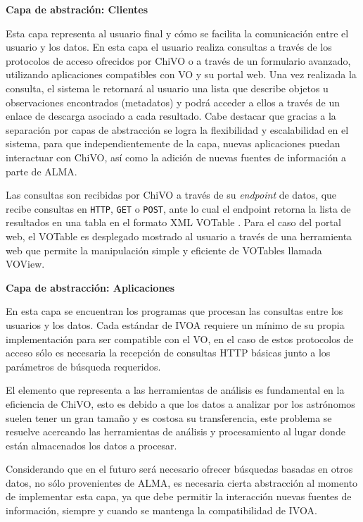 \textbf{Capa de abstración: Clientes}

Esta capa representa al usuario final y cómo se facilita la comunicación entre el
usuario y los datos.
En esta capa el usuario realiza consultas a través de los protocolos de acceso
ofrecidos por ChiVO o a través de un formulario avanzado, utilizando aplicaciones
compatibles con VO y su portal web.
Una vez realizada la consulta, el sistema le retornará al usuario una lista que
describe objetos u observaciones encontrados (metadatos) y podrá acceder a ellos a
través de un enlace de descarga asociado a cada resultado.
Cabe destacar que gracias a la separación por capas de abstracción se logra la
flexibilidad y escalabilidad en el sistema, para que independientemente de la capa,
nuevas aplicaciones puedan interactuar con ChiVO, así como la adición de nuevas
fuentes de información a parte de ALMA.

Las consultas son recibidas por ChiVO a través de su \emph{endpoint} de datos, que
recibe consultas en \texttt{HTTP}, \texttt{GET} o \texttt{POST}, ante lo cual el
endpoint retorna la lista de resultados en una tabla en el formato XML VOTable 
\cite{ochsenbein2011ivoa}.
Para el caso del portal web, el VOTable es desplegado mostrado al usuario a través
de una herramienta web que permite la manipulación simple y eficiente de VOTables
llamada VOView.

\textbf{Capa de abstracción: Aplicaciones}

En esta capa se encuentran los programas que procesan las consultas entre los
usuarios y los datos.
Cada estándar de IVOA requiere un mínimo de su propia implementación para ser
compatible con el VO, en el caso de estos protocolos de acceso sólo es necesaria la
recepción de consultas HTTP básicas junto a los parámetros de búsqueda requeridos.

El elemento que representa a las herramientas de análisis es fundamental en la
eficiencia de ChiVO, esto es debido a que los datos a analizar por los astrónomos
suelen tener un gran tamaño y es costosa su transferencia, este problema se
resuelve acercando las herramientas de análisis y procesamiento al lugar donde están
almacenados los datos a procesar.

Considerando que en el futuro será necesario ofrecer búsquedas
basadas en otros datos, no sólo provenientes de ALMA, es necesaria cierta
abstracción al momento de implementar esta capa, ya que debe permitir la interacción
nuevas fuentes de información, siempre y cuando se mantenga la compatibilidad
de IVOA.

